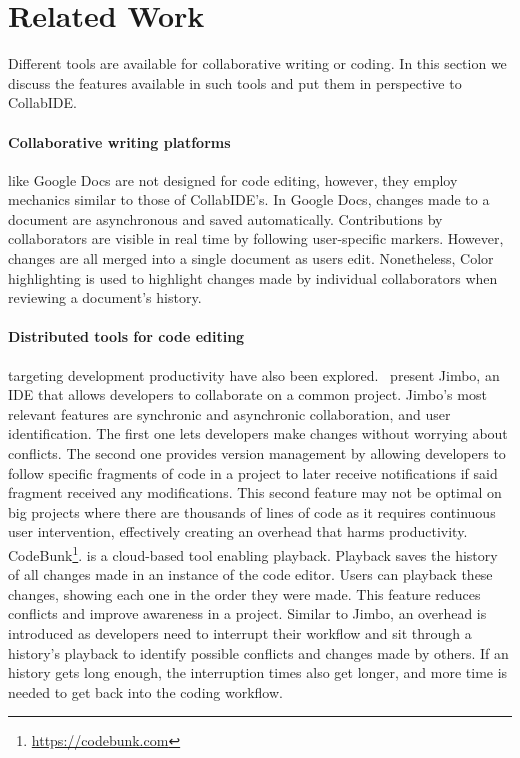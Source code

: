 

\section{Related Work}
\label{sec:related}

Different tools are available for collaborative writing or coding.
In this section we discuss the features available in such tools and put them in perspective to CollabIDE.

\paragraph
{Collaborative writing platforms} like Google Docs are not designed for code editing, however, they 
employ mechanics similar to those of CollabIDE’s. In Google Docs, changes made to a document are 
asynchronous and saved automatically. Contributions by collaborators are visible in real time by 
following user-specific markers. However,  changes are all merged into a single document as users 
edit. Nonetheless, Color highlighting is used to highlight changes made by individual collaborators 
when reviewing a document’s history.

\paragraph
{Distributed tools for code editing} targeting development productivity have also been 
explored.~\citet{ghorashi} present Jimbo, an IDE that allows developers to collaborate on a common 
project. Jimbo's most relevant features are synchronic and asynchronic collaboration, and user 
identification. The first one lets developers make changes without worrying about conflicts. The second 
one provides version management by allowing developers to follow specific fragments of code in a 
project to later receive notifications if said fragment received any modifications. This second feature may 
not be optimal on big projects where there are thousands of lines of code as it requires continuous user 
intervention, effectively creating an overhead that harms productivity. 
CodeBunk\footnote{\url{https://codebunk.com}}. is a cloud-based tool enabling playback. Playback 
saves the history of all changes made in an instance of the code editor. Users can playback these 
changes, showing each one in the order they were made. This feature reduces conflicts and improve 
awareness in a project. Similar to Jimbo, an overhead is introduced as developers need to interrupt 
their workflow and sit through a history’s playback to identify possible conflicts and changes made by 
others. If an history gets long enough, the interruption times also get longer, and more time is needed 
to get back into the coding workflow.

